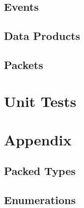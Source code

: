 

\subsection{Events}



\subsection{Data Products}



\subsection{Packets}



\section{Unit Tests}



\section{Appendix}
\subsection{Packed Types}



\subsection{Enumerations}




